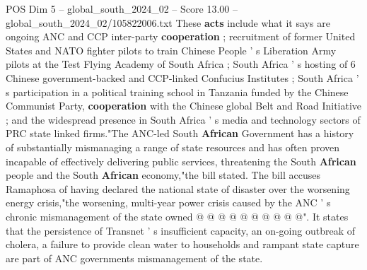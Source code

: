 \begin{textsample}{POS Dim 5 – global\_south\_2024\_02 – Score 13.00 – global\_south\_2024\_02/105822006.txt}
These \textbf{acts} include what it says are ongoing ANC and CCP inter-party \textbf{cooperation} ; recruitment of former United States and NATO fighter pilots to train Chinese People ' s Liberation Army pilots at the Test Flying Academy of South Africa ; South Africa ' s hosting of 6 Chinese government-backed and CCP-linked Confucius Institutes ; South Africa ' s participation in a political training school in Tanzania funded by the Chinese Communist Party, \textbf{cooperation} with the Chinese global Belt and Road Initiative ; and the widespread presence in South Africa ' s media and technology sectors of PRC state linked firms."The ANC-led South \textbf{African} Government has a history of substantially mismanaging a range of state resources and has often proven incapable of effectively delivering public services, threatening the South \textbf{African} people and the South \textbf{African} economy,"the bill stated.
The bill accuses Ramaphosa of having declared the national state of disaster over the worsening energy crisis,"the worsening, multi-year power crisis caused by the ANC ' s chronic mismanagement of the state owned @ @ @ @ @ @ @ @ @ @".
It states that the persistence of Transnet ' s insufficient capacity, an on-going outbreak of cholera, a failure to provide clean water to households and rampant state capture are part of ANC governments mismanagement of the state.

\end{textsample}
